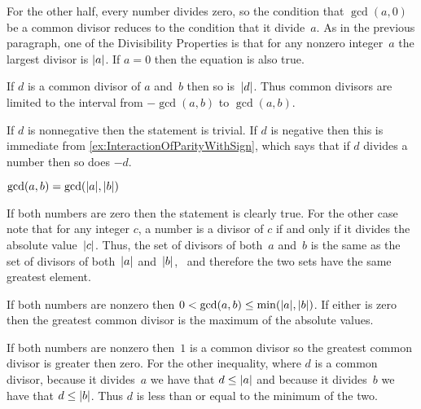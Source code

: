 \documentclass{ibl}  %
\begin{document}
\begin{problem}
\begin{exes}
\begin{answer}
  For the other half, 
  every number divides zero, so the condition that $\gcd(a,0)$ be a common
  divisor reduces to the condition that it divide~$a$.
  As in the previous paragraph, one of the Divisibility Properties  
  is that for any nonzero integer~$a$ the largest divisor is $\lvert a\rvert$.
  If $a=0$ then the equation is also true.  
\end{answer}
\begin{exercise} 
  If $d$ is a common divisor of $a$ and~$b$ then so is~$\lvert d\rvert$.
  Thus common divisors are limited to the interval from $-\gcd(a,b)$
  to $\gcd(a,b)$.
\end{exercise}
\begin{answer}
  If $d$ is nonnegative then the statement is trivial.
  If $d$ is negative then
  this is immediate from \ref{ex:InteractionOfParityWithSign},
  which says that if $d$ divides a number then so does $-d$.  
\end{answer}
\begin{exercise} 
  $\gcd(a,b)=\gcd(\lvert a\rvert,\lvert b\rvert)$
\end{exercise}
\begin{answer}
  If both numbers are zero then the statement is clearly true.
  For the other case note that for any
  integer $c$, a number is a divisor of $c$ if and only if it divides 
  the absolute value~$\lvert c\rvert$.
  Thus, the set of divisors of both~$a$ and~$b$ 
  is the same as the set of divisors of both~$\lvert a\rvert$ and~$\lvert b\rvert$, \
  and therefore the two sets have the same greatest element.  
\end{answer}
\begin{exercise}[\midlength] 
  If both numbers are nonzero then 
  $0< \gcd(a,b)\leq\min(\lvert a\rvert,\lvert b\rvert)$.
  If either is zero then the greatest common divisor is the 
  maximum of the absolute values.
\end{exercise}
\begin{answer}
  If both numbers are nonzero then~$1$ is a common divisor so 
  the greatest common divisor is greater then zero.
  For the other inequality,
  where $d$ is a common divisor, 
  because it divides~$a$ we have that $d\leq\lvert a\rvert$ and
  because it divides~$b$ we have that $d\leq\lvert b\rvert$.
  Thus $d$ is less than or equal to the minimum of the two.


\end{answer}
\end{exes}
\end{problem}
\end{document}
